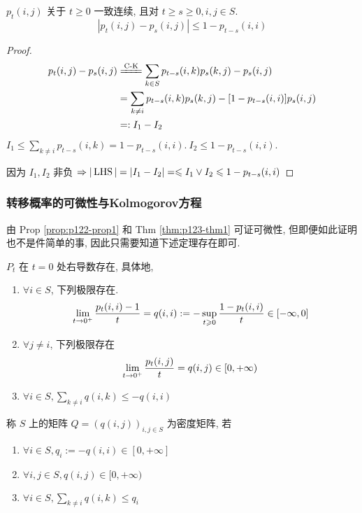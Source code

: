 \begin{theorem}\label{thm:p123-thm1}
    $p_t(i,j)$ 关于 $t\geq 0$ 一致连续, 且对 $t\geq s\geq 0, i,j\in S$.
    \begin{equation}
        |p_t(i,j)-p_s(i,j) |\leq 1-p_{t-s}(i,i)
    \end{equation}
\end{theorem}

\begin{proof}
    \[
    \begin{aligned}
        p_t(i,j)-p_s(i,j) &\xlongequal{\text{C-K}} \sum_{k\in S}p_{t-s}(i,k)p_s(k,j)-p_s(i,j)\\
        &=\sum_{k\neq i}p_{t-s}(i,k) p_s(k,j)-[1-p_{t-s}(i,i)]p_s(i,j)\\
        &=: I_1-I_2
    \end{aligned}
    \]
    $I_1\leq \sum_{k\neq i}p_{t-s}(i,k)=1-p_{t-s}(i,i).\ I_2\leq 1-p_{t-s}(i,i)$. 

    因为 $I_1,I_2$ 非负 $\Rightarrow |\operatorname{LHS}|=|I_1-I_2|=\leqslant I_1\lor I_2\leqslant 1-p_{t-s}(i,i)$
\end{proof}

\subsubsection{转移概率的可微性与Kolmogorov方程}

由 Prop \ref{prop:p122-prop1} 和 Thm \ref{thm:p123-thm1} 可证可微性, 但即便如此证明也不是件简单的事, 因此只需要知道下述定理存在即可.

\begin{theorem}\label{thm:p124-thm2}
    $P_t$ 在 $t=0$ 处右导数存在, 具体地,
    \begin{enumerate}
        \item $\forall i\in S$, 下列极限存在.
        \[
        \lim_{t \to 0^+}\frac{p_t(i,i)-1}{t}=q(i,i):=-\sup_{t\geqslant 0}\frac{1-p_t(i,i)}{t}\in [-\infty,0]
        \]
        \item $\forall j\neq i$, 下列极限存在
        \[
            \lim_{t \to 0^+}\frac{p_t(i,j)}{t}=q(i,j)\in [0,+\infty)
        \]
        \item $\forall i\in S, \sum_{k\neq i}q(i,k)\leq -q(i,i)$
    \end{enumerate}
\end{theorem}

\begin{definition}
    称 $S$ 上的矩阵 $Q=(q(i,j))_{i,j\in S}$ 为密度矩阵, 若
    \begin{enumerate}
        \item $\forall i\in S,q_i:=-q(i,i)\in [0,+\infty]$
        \item $\forall i,j\in S,q(i,j)\in [0,+\infty)$
        \item $\forall i\in S, \sum_{k\neq i}q(i,k)\leq q_i$
    \end{enumerate}
\end{definition}

